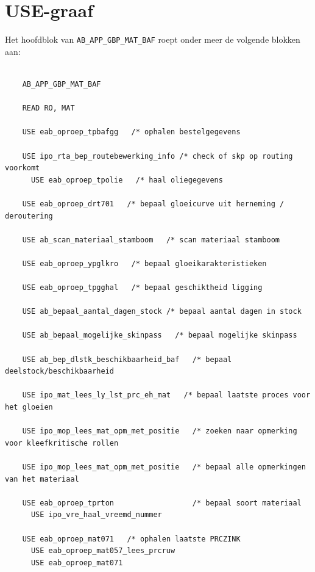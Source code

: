 \section{USE-graaf}
\label{sec:bijlage-usegraaf}

Het hoofdblok van \texttt{AB\_APP\_GBP\_MAT\_BAF} roept onder meer de volgende blokken aan:

\begin{center}
    \label{lst:USE-graaf}
\end{center}

\begin{verbatim}
    
    AB_APP_GBP_MAT_BAF
    
    READ RO, MAT
    
    USE eab_oproep_tpbafgg   /* ophalen bestelgegevens
    
    USE ipo_rta_bep_routebewerking_info /* check of skp op routing voorkomt
      USE eab_oproep_tpolie   /* haal oliegegevens
    
    USE eab_oproep_drt701   /* bepaal gloeicurve uit herneming / deroutering
    
    USE ab_scan_materiaal_stamboom   /* scan materiaal stamboom
    
    USE eab_oproep_ypglkro   /* bepaal gloeikarakteristieken
    
    USE eab_oproep_tpgghal   /* bepaal geschiktheid ligging
    
    USE ab_bepaal_aantal_dagen_stock /* bepaal aantal dagen in stock
    
    USE ab_bepaal_mogelijke_skinpass   /* bepaal mogelijke skinpass
    
    USE ab_bep_dlstk_beschikbaarheid_baf   /* bepaal deelstock/beschikbaarheid
    
    USE ipo_mat_lees_ly_lst_prc_eh_mat   /* bepaal laatste proces voor het gloeien
    
    USE ipo_mop_lees_mat_opm_met_positie   /* zoeken naar opmerking voor kleefkritische rollen
    
    USE ipo_mop_lees_mat_opm_met_positie   /* bepaal alle opmerkingen van het materiaal
    
    USE eab_oproep_tprton                  /* bepaal soort materiaal
      USE ipo_vre_haal_vreemd_nummer
    
    USE eab_oproep_mat071   /* ophalen laatste PRCZINK
      USE eab_oproep_mat057_lees_prcruw
      USE eab_oproep_mat071
    

\end{verbatim}
